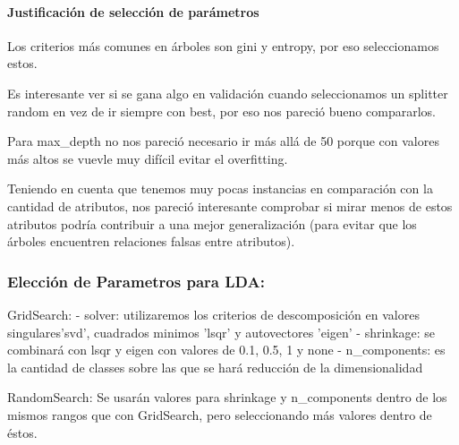 \documentclass[11pt]{article}
\begin{document}
\paragraph{Justificación de selección de
parámetros}\label{justificaciuxf3n-de-selecciuxf3n-de-paruxe1metros}

Los criterios más comunes en árboles son gini y entropy, por eso
seleccionamos estos.

Es interesante ver si se gana algo en validación cuando seleccionamos un
splitter random en vez de ir siempre con best, por eso nos pareció bueno
compararlos.

Para max\_depth no nos pareció necesario ir más allá de 50 porque con
valores más altos se vuevle muy difícil evitar el overfitting.

Teniendo en cuenta que tenemos muy pocas instancias en comparación con
la cantidad de atributos, nos pareció interesante comprobar si mirar
menos de estos atributos podría contribuir a una mejor generalización
(para evitar que los árboles encuentren relaciones falsas entre
atributos).

    \subsubsection{Elección de Parametros para
LDA:}\label{elecciuxf3n-de-parametros-para-lda}

GridSearch: - solver: utilizaremos los criterios de descomposición en
valores singulares'svd', cuadrados minimos 'lsqr' y autovectores 'eigen'
- shrinkage: se combinará con lsqr y eigen con valores de 0.1, 0.5, 1 y
none - n\_components: es la cantidad de classes sobre las que se hará
reducción de la dimensionalidad

RandomSearch: Se usarán valores para shrinkage y n\_components dentro de
los mismos rangos que con GridSearch, pero seleccionando más valores
dentro de éstos.
\end{document}
